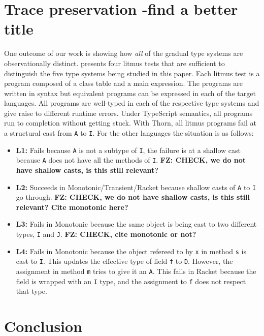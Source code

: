 \documentclass[acmlarge, anonymous, authordraft, review]{acmart} %
\newcommand{\code}[1]{{\tt #1}\xspace}
\newcommand{\FZ}[1]{\textbf{FZ: #1}}
\begin{document}
\section{Trace preservation  -find a better title}\label{litm}

One outcome of our work is showing how \emph{all} of the gradual type systems
are observationally distinct.   presents four litmus tests that
are sufficient to distinguish the five type systems being studied in this
paper.  Each litmus test is a program composed of a class table and a main
expression. The programs are written in \kafka syntax but equivalent
programs can be expressed in each of the target languages. All programs are
well-typed in each of the respective type systems and give raise to
different runtime errors. Under TypeScript semantics, all programs run to
completion without getting stuck. With Thorn, all litmus programs fail at a structural cast from \code A to \code I.  For the other languages the situation is
as follows:
\begin{itemize}
\item {\bf L1:} Fails because \code A is not a subtype of \code I, the
  failure is at a shallow cast because \code A does not have all the methods of
  \code I.   \FZ{CHECK, we do not have shallow casts, is this still relevant?}
\item{\bf L2:} Succeeds in Monotonic/Transient/Racket because shallow casts
  of \code A to \code I go through. \FZ{CHECK, we do not have shallow casts, is this still relevant?  Cite monotonic here?}
\item{\bf L3:} Fails in Monotonic because the same object is being cast to
  two different types, \code I and \code J.  \FZ{CHECK, cite monotonic or not?}
\item{\bf L4:} Fails in Monotonic because the object refereed to by \code x
  in method \code s is cast to \code I. This updates the effective type of field
  \code f to \code D. However, the assignment in method \code m tries to give it
  an \code A. This fails in Racket because the \this field is wrapped with an
  \code I type, and the assignment to \code f does not respect that type.
\end{itemize}



\section{Conclusion}
\end{document}
